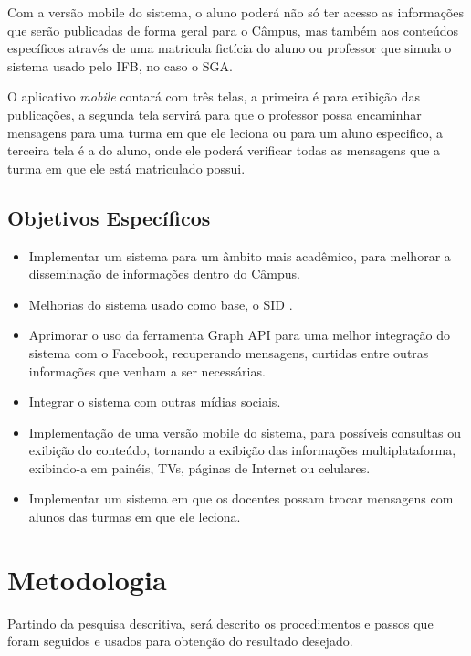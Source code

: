 Com a versão mobile do sistema, o aluno poderá não só ter acesso as informações que serão publicadas de forma geral para o Câmpus, mas também aos conteúdos específicos através de uma matricula fictícia do aluno ou professor que simula o sistema usado pelo IFB, no caso o SGA. 

O aplicativo \textit{mobile} contará com três telas, a primeira é para exibição das publicações, a segunda tela servirá para que o professor possa encaminhar mensagens para uma turma em que ele leciona ou para um aluno especifico, a terceira tela é a do aluno, onde ele poderá verificar todas as mensagens que a turma em que ele está matriculado possui.

\subsection{Objetivos Específicos}
	 \begin{itemize}
	\item Implementar um sistema para um âmbito mais acadêmico, para melhorar a disseminação de informações dentro do Câmpus.
	 	
	\item Melhorias do sistema usado como base, o SID \cite{sobrinho2017}.
	
	\item Aprimorar o uso da ferramenta Graph API para uma melhor integração do sistema com o Facebook, recuperando mensagens, curtidas entre outras informações que venham a ser necessárias.
	
	\item Integrar o sistema com outras mídias sociais.
	
	\item Implementação de uma versão mobile do sistema, para possíveis consultas ou exibição do conteúdo, tornando a exibição das informações multiplataforma, exibindo-a em painéis, TVs, páginas de Internet ou celulares.
	
	\item  Implementar um sistema em que os docentes possam trocar mensagens com alunos das turmas em que ele leciona.
	\end{itemize}
\section{Metodologia}
Partindo da pesquisa descritiva, será descrito os procedimentos e passos que foram seguidos e usados para obtenção do resultado desejado.
	
